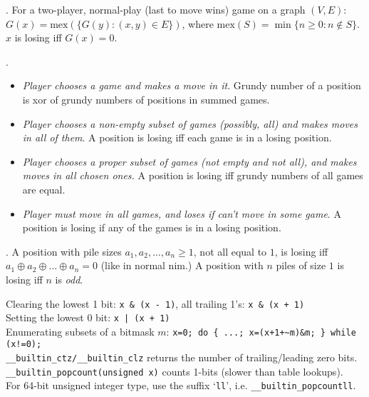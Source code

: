 
.
For a two-player, normal-play (last to move wins) game on a graph $(V,E)$:
$G(x) = \mbox{mex}(\{ G(y) : (x, y) \in E \})$,
where $\mbox{mex}(S) = \min \{ n \ge 0: n \not\in S \}$.
$x$ is losing iff $G(x) = 0$.

.

\vspace{-4mm}
\begin{itemize}
  \item
    \emph{Player chooses a game and makes a move in it}.
    Grundy number of a position is xor of grundy numbers of positions in summed games.
  \item
    \emph{Player chooses a non-empty subset of games (possibly, all) and makes moves in all of them}.
    A position is losing iff each game is in a losing position.
  \item
    \emph{Player chooses a proper subset of games (not empty and not all),
        and makes moves in all chosen ones.}
    A position is losing iff grundy numbers of all games are equal.
  \item
    \emph{Player must move in all games, and loses if can't move in some game}.
    A position is losing if any of the games is in a losing position.
\end{itemize}

\vspace{-3mm}

.
A position with pile sizes $a_1, a_2, \dots, a_n \ge 1$,
not all equal to $1$, is losing iff $a_1 \oplus a_2 \oplus \dots \oplus a_n = 0$
(like in normal nim.)
A position with $n$ piles of size $1$ is losing iff $n$ is \emph{odd}.



Clearing the lowest 1 bit: \verb$x & (x - 1)$, all trailing 1's: \verb$x & (x + 1)$ \\
Setting the lowest 0 bit: \verb$x | (x + 1)$ \\
Enumerating subsets of a bitmask $m$:
\verb|x=0; do { ...; x=(x+1+~m)&m; } while (x!=0);| \\
\verb$__builtin_ctz/__builtin_clz$ returns the number of trailing/leading zero bits. \\
\verb$__builtin_popcount(unsigned x)$ counts 1-bits (slower than table lookups). \\
For 64-bit unsigned integer type, use the suffix `\verb$ll$', i.e. \verb$__builtin_popcountll$.

